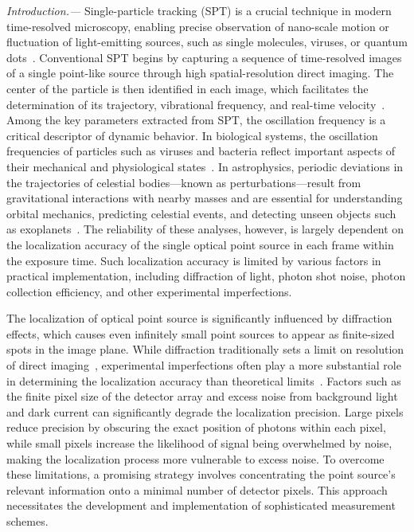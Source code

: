 \documentclass[aps,pra,10pt,showpacs,amsmath,amssymb,floatfix,superscriptaddress,twocolumn]{revtex4-2}
\begin{document}
\textit{Introduction.---}
Single-particle tracking (SPT) is a crucial technique in modern time-resolved microscopy, enabling precise observation of nano-scale motion or fluctuation of light-emitting sources, such as single molecules, viruses, or quantum dots~\cite{Levi2007,Mortensen2010,Deschout2014,Shen2017}.
Conventional SPT begins by capturing a sequence of time-resolved images of a single point-like source through high spatial-resolution direct imaging.
The center of the particle is then identified in each image, which facilitates the determination of its trajectory, vibrational frequency, and real-time velocity~\cite{Cheezum2001,Carter2005}.
Among the key parameters extracted from SPT, the oscillation frequency is a critical descriptor of dynamic behavior.
In biological systems, the oscillation frequencies of particles such as viruses and bacteria reflect important aspects of their mechanical and physiological states~\cite{Zhang2025}.
In astrophysics, periodic deviations in the trajectories of celestial bodies---known as perturbations---result from gravitational interactions with nearby masses and are essential for understanding orbital mechanics, predicting celestial events, and detecting unseen objects such as exoplanets~\cite{Mouret2007}.
The reliability of these analyses, however, is largely dependent on the localization accuracy of the single optical point source in each frame within the exposure time.
Such localization accuracy is limited by various factors in practical implementation, including diffraction of light, photon shot noise, photon collection efficiency, and other experimental imperfections.


The localization of optical point source is significantly influenced by diffraction effects, which causes even infinitely small point sources to appear as finite-sized spots in the image plane.
While diffraction traditionally sets a limit on resolution of direct imaging~\cite{LordRayleigh1879,Ram2006}, experimental imperfections often play a more substantial role in determining the localization accuracy than theoretical limits~\cite{Deschout2014,Thompson2002,Yildiz2003}.
Factors such as the finite pixel size of the detector array and excess noise from background light and dark current can significantly degrade the localization precision.
Large pixels reduce precision by obscuring the exact position of photons within each pixel, while small pixels increase the likelihood of signal being overwhelmed by noise, making the localization process more vulnerable to excess noise.
To overcome these limitations, a promising strategy involves concentrating the point source's relevant information onto a minimal number of detector pixels. 
This approach necessitates the development and implementation of sophisticated measurement schemes.
\end{document}

